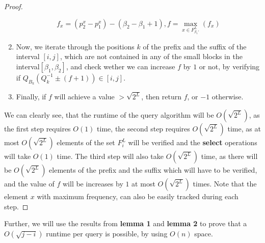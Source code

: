 \documentclass[runningheads]{llncs}
\begin{document}
\begin{proof}
\begin{enumerate}
            \[
                f_x=(p^x_2-p^x_1)-(\beta_2-\beta_1+1), f=\max_{x \in F_{\beta_1'}^L }( f_x )
            \]  
            
            \item Now, we iterate through the positions $k$ of the prefix and the suffix of the interval $[i,j]$, which are not contained in any of the 
            small blocks in the interval$[\beta_1, \beta_2]$, and check wether we can increase $f$ by $1$ or not, by verifying if $Q_{B_k}(Q^{-1}_k \pm (f+1) ) \in [i,j]$.
            
            \item Finally, if $f$ will achieve a value $>\sqrt{2^L}$, then return $f$, or $-1$ otherwise.

        \end{enumerate}

        We can clearly see, that the runtime of the query algorithm will be $O(\sqrt{2^L})$, as the first step requires $O(1)$ time, 
        the second step requires $O(\sqrt{2^L})$ time, as at most $O(\sqrt{2^L})$ elements of the set $F_i^L$ will be verified and the \textbf{select} operations will take $O(1)$ time.
        The third step will also take $O(\sqrt{2^L})$ time, as there will be $O(\sqrt{2^L})$ elements of the prefix and the suffix which will have to be verified, and the value of $f$ 
        will be increases by $1$ at most $O(\sqrt{2^L})$ times. Note that the element $x$ with maximum frequency, can also be easily tracked during each step.   

\end{proof}

Further, we will use the results from \textbf{lemma 1} and \textbf{lemma 2} to prove that a $O(\sqrt{j-i})$ runtime per query is possible, by using $O(n)$ space.
\end{document}
